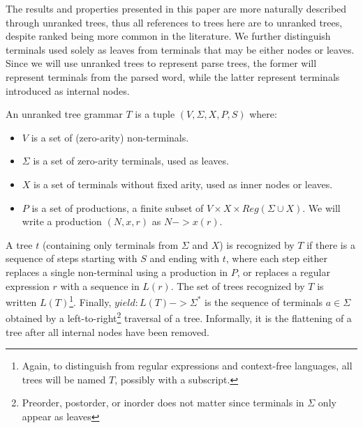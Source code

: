 \documentclass[runningheads]{llncs}
\newcommand{\NT}{V} %
\newcommand{\T}{\Sigma} %
\newcommand{\regex}{\mathit{Reg}}
\begin{document}
The results and properties presented in this paper are more naturally described through unranked trees, thus all references to trees here are to unranked trees, despite ranked being more common in the literature. We further distinguish terminals used solely as leaves from terminals that may be either nodes or leaves. Since we will use unranked trees to represent parse trees, the former will represent terminals from the parsed word, while the latter represent terminals introduced as internal nodes.

An unranked tree grammar $T$ is a tuple $(\NT, \T, X, P, S)$ where:

\begin{itemize}
\item $\NT$ is a set of (zero-arity) non-terminals.
\item $\T$ is a set of zero-arity terminals, used as leaves.
\item $X$ is a set of terminals without fixed arity, used as inner nodes or leaves.
\item $P$ is a set of productions, a finite subset of $\NT \times X \times \regex(\T \cup X)$. We will write a production $(N, x, r)$ as $N -> x(r)$.
\end{itemize}

\noindent A tree $t$ (containing only terminals from $\T$ and $X$) is recognized by $T$ if there is a sequence of steps starting with $S$ and ending with $t$, where each step either replaces a single non-terminal using a production in $P$, or replaces a regular expression $r$ with a sequence in $L(r)$. The set of trees recognized by $T$ is written $L(T)$\footnote{Again, to distinguish from regular expressions and context-free languages, all trees will be named $T$, possibly with a subscript.}. Finally, $yield : L(T) -> \T^{*}$ is the sequence of terminals $a \in \T$ obtained by a left-to-right\footnote{Preorder, postorder, or inorder does not matter since terminals in $\T$ only appear as leaves} traversal of a tree. Informally, it is the flattening of a tree after all internal nodes have been removed.
\end{document}
